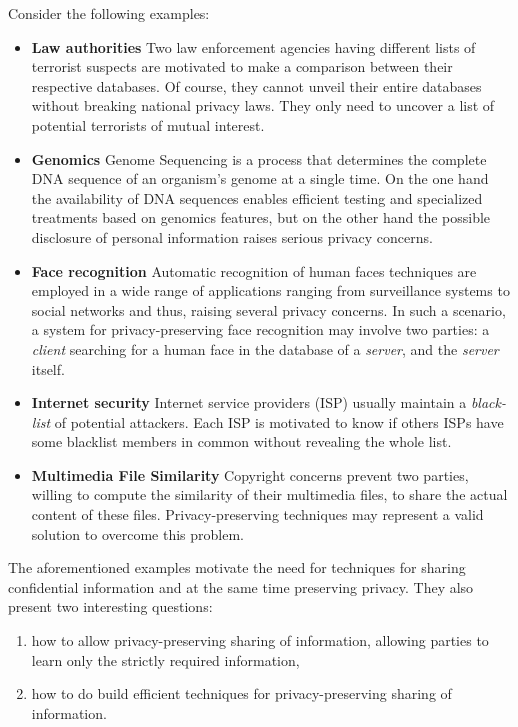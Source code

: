 \documentclass[dvips,12pt]{article}
\begin{document}
Consider the following examples:
\begin{itemize}
\item \textbf{Law authorities} Two law enforcement agencies having different lists of terrorist suspects are motivated to make a comparison between their respective databases. 
Of course, they cannot unveil their entire databases without breaking national privacy laws. They only need to uncover a list of potential terrorists of mutual interest.
\item \textbf{Genomics} Genome Sequencing is a process that determines the complete DNA sequence of an organism's genome at a single time. 
On the one hand the availability of DNA sequences enables efficient testing and specialized treatments based on genomics features, but on the other hand the possible disclosure of personal information raises serious privacy concerns.
\item \textbf{Face recognition} Automatic recognition of human faces techniques are employed in a wide range of applications ranging from surveillance systems to social networks and thus, raising several privacy concerns. In such a scenario, a system for privacy-preserving face recognition may involve two parties: a \emph{client} searching for a human face in the database of a \emph{server}, and the \emph{server} itself.
\item \textbf{Internet security} Internet service providers (ISP) usually maintain a \emph{black-list} of potential attackers. Each ISP is motivated to know if others ISPs have some blacklist members in common without revealing the whole list.
\item \textbf{Multimedia File Similarity} Copyright concerns prevent two parties, willing to compute the similarity of their multimedia files, to share the actual content of these files. Privacy-preserving techniques may represent a valid solution to overcome this problem.
\end{itemize} 

The aforementioned examples motivate the need for techniques for sharing confidential information and at the same time preserving privacy. 
They also present two interesting questions: 
\begin{enumerate}
\item how to allow privacy-preserving sharing of information, allowing parties to learn only the strictly required information, 
\item how to do build efficient techniques for privacy-preserving sharing of information.
\end{enumerate} 
\end{document}
